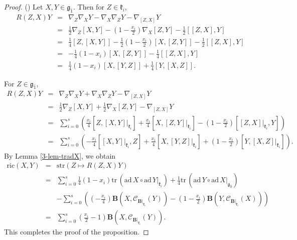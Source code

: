 \documentclass[reqno]{amsart}
\theoremstyle{definition}
\begin{document}
\begin{proof}
() Let $X,Y\in\mathfrak{g}_{\bar{1}}$. Then for  $Z\in \mathfrak{k}_{i}$,
\begin{eqnarray*}
R(Z,X)Y&=&\nabla_{Z}\nabla_{X}Y-\nabla_{X}\nabla_{Z}Y-\nabla_{[Z,X]}Y\\
       &=&\frac{1}{2}\nabla_{Z}[X,Y]-\left(1-\frac{x_{i}}{2}\right)\nabla_{X}[Z,Y]-\frac{1}{2}[[Z,X],Y]\\
       &=&\frac{1}{4}[Z,[X,Y]]-\frac{1}{2}\left(1-\frac{x_{i}}{2}\right)[X,[Z,Y]]-\frac{1}{2}[[Z,X],Y]\\
       &=&-\frac{1}{4}(1-x_{i})[X,[Z,Y]]-\frac{1}{4}[[Z,X],Y]\\
       &=&\frac{1}{4}(1-x_{i})[X,[Y,Z]]+\frac{1}{4}[Y,[X,Z]].
\end{eqnarray*}

For  $Z\in\mathfrak{g}_{\bar{1}}$,
\begin{eqnarray*}
R(Z,X)Y&=&\nabla_{Z}\nabla_{X}Y+\nabla_{X}\nabla_{Z}Y-\nabla_{[Z,X]}Y\\
       &=&\frac{1}{2}\nabla_{Z}[X,Y]+\frac{1}{2}\nabla_{X}[Z,Y]-\nabla_{[Z,X]}Y\\
       &=&\sum_{i=0}^{s}\left(\frac{x_{i}}{4}[Z,[X,Y]|_{\mathfrak{k}_{i}}]+\frac{x_{i}}{4}[X,[Z,Y]|_{\mathfrak{k}_{i}}]-\left(1-\frac{x_{i}}{2}\right)[[Z,X]|_{\mathfrak{k}_{i}},Y]\right)\\
       &=&\sum_{i=0}^{s}\left(-\frac{x_{i}}{4}[[X,Y]|_{\mathfrak{k}_{i}},Z]+\frac{x_{i}}{4}[X,[Y,Z]|_{\mathfrak{k}_{i}}]+\left(1-\frac{x_{i}}{2}\right)[Y,[X,Z]|_{\mathfrak{k}_{i}}]\right).
\end{eqnarray*}
By Lemma \ref{3-lem-tradX}, we obtain
\begin{eqnarray*}
\mathrm{ric}(X,Y)&=&\mathrm{str}(Z\mapsto R(Z,X)Y)\\
                 &=&\sum\limits_{i=0}^{s}\frac{1}{4}(1-x_{i})\mathrm{tr}\,(\mathrm{ad}\,X\circ\mathrm{ad}\,Y|_{\mathfrak{k}_{i}})
                    +\frac{1}{4}\mathrm{tr}\,(\mathrm{ad}\,Y\circ\mathrm{ad}\,X|_{\mathfrak{g}_{\bar{0}}})\\
                 &&-\sum_{i=0}^{s}\left(\left(-\frac{x_{i}}{4}\right)\mathbf{B}\left(X,\mathcal{C}_{\mathbf{B}|_{\mathfrak{k}_{i}}}(Y)\right)
                    -\left(1-\frac{x_{i}}{2}\right)\mathbf{B}\left(Y,\mathcal{C}_{\mathbf{B}|_{\mathfrak{k}_{i}}}(X)\right) \right)\\
                 &=&\sum_{i=0}^{s}\left(\frac{x_{i}}{2}-1\right)\mathbf{B}\left(X,\mathcal{C}_{\mathbf{B}|_{\mathfrak{k}_{i}}}(Y)\right).
\end{eqnarray*}
This completes the proof of the proposition.
\end{proof}
\end{document}
